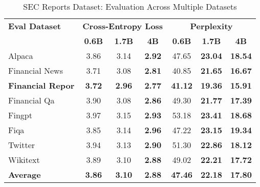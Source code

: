 
\begin{table}[h]
\centering
\caption[SEC Reports: Evaluation Results]{SEC Reports Dataset: Evaluation Across Multiple Datasets}
\label{tab:sec_reports_results}
\begin{tabular}{l|ccc|ccc}
\hline
\textbf{Eval Dataset} & \multicolumn{3}{c|}{\textbf{Cross-Entropy Loss}} & \multicolumn{3}{c}{\textbf{Perplexity}} \\
\cline{2-4} \cline{5-7}
  & \textbf{0.6B} & \textbf{1.7B} & \textbf{4B} & \textbf{0.6B} & \textbf{1.7B} & \textbf{4B} \\
\hline
Alpaca & 3.86 & 3.14 & \textbf{2.92} & 47.65 & \textbf{23.04} & \textbf{18.54} \\
Financial News & 3.71 & 3.08 & \textbf{2.81} & 40.85 & \textbf{21.65} & \textbf{16.67} \\
\textbf{Financial Repor} & \textbf{3.72} & \textbf{2.96} & \textbf{2.77} & \textbf{41.12} & \textbf{19.36} & \textbf{15.91} \\
Financial Qa & 3.90 & 3.08 & \textbf{2.86} & 49.30 & \textbf{21.77} & \textbf{17.39} \\
Fingpt & 3.97 & 3.15 & \textbf{2.93} & 53.18 & \textbf{23.41} & \textbf{18.68} \\
Fiqa & 3.85 & 3.14 & \textbf{2.96} & 47.22 & \textbf{23.15} & \textbf{19.34} \\
Twitter & 3.94 & 3.13 & \textbf{2.90} & 51.30 & \textbf{22.86} & \textbf{18.12} \\
Wikitext & 3.89 & 3.10 & \textbf{2.88} & 49.02 & \textbf{22.21} & \textbf{17.72} \\
\hline
\textbf{Average} & \textbf{3.86} & \textbf{3.10} & \textbf{2.88} & \textbf{47.46} & \textbf{22.18} & \textbf{17.80} \\
\hline
\end{tabular}
\end{table}

